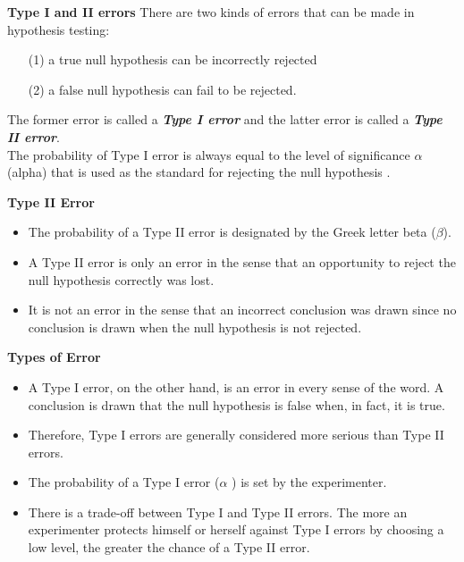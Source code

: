 \documentclass[a4]{beamer}
\begin{document}

\noindent \textbf{Type I and II errors}
\large
There are two kinds of errors that can be made in hypothesis testing:
\begin{itemize}
\item[(1)] a true null hypothesis can be incorrectly rejected
\item[(2)] a false null hypothesis can fail to be rejected.
\end{itemize}
The former error is called a \textbf{\emph{Type I error}} and the latter error is called a \textbf{\emph{Type II error}}. \\ \bigskip
The probability of Type I error is always equal to the level of significance $\alpha$ (alpha) that is used as the standard for rejecting the null hypothesis .


\noindent \textbf{Type II Error}
\begin{itemize}

\item The probability of a Type II error is designated by the Greek letter beta ($\beta$).
\item A Type II error is only an error in the sense that an opportunity to reject the null hypothesis correctly was lost.
\item It is not an error in the sense that an incorrect conclusion was drawn since no conclusion is drawn when the null hypothesis is not rejected.
\end{itemize}


\noindent \textbf{Types of Error}
\large
\begin{itemize}
\item
A Type I error, on the other hand, is an error in every sense of the word. A conclusion is drawn that the null hypothesis is false when, in fact, it is true. \item Therefore, Type I errors are generally considered more serious than Type II errors.
\item
The probability of a Type I error ($\alpha$ ) is set by the experimenter. \item There is a trade-off between Type I and Type II errors. The more an experimenter protects himself or herself against Type I errors by choosing a low level, the greater the chance of a Type II error.
\end{itemize}
\end{document}
